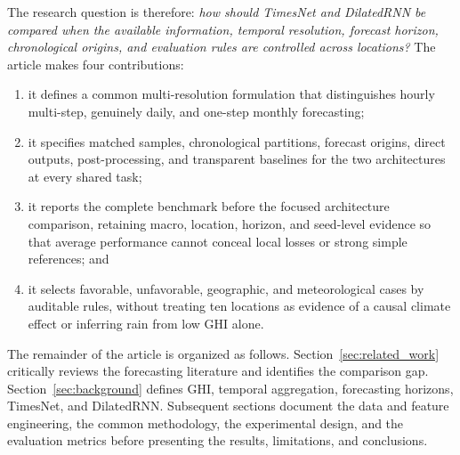 The research question is therefore: \emph{how should TimesNet and DilatedRNN
be compared when the available information, temporal resolution, forecast
horizon, chronological origins, and evaluation rules are controlled across
locations?} The article makes four contributions:
\begin{enumerate}
  \item it defines a common multi-resolution formulation that distinguishes
  hourly multi-step, genuinely daily, and one-step monthly forecasting;
  \item it specifies matched samples, chronological partitions, forecast
  origins, direct outputs, post-processing, and transparent baselines for the
  two architectures at every shared task;
  \item it reports the complete benchmark before the focused architecture
  comparison, retaining macro, location, horizon, and seed-level evidence so
  that average performance cannot conceal local losses or strong simple
  references; and
  \item it selects favorable, unfavorable, geographic, and meteorological
  cases by auditable rules, without treating ten locations as evidence of a
  causal climate effect or inferring rain from low GHI alone.
\end{enumerate}

The remainder of the article is organized as follows.
Section~\ref{sec:related_work} critically reviews the forecasting literature
and identifies the comparison gap. Section~\ref{sec:background} defines GHI,
temporal aggregation, forecasting horizons, TimesNet, and DilatedRNN.
Subsequent sections document the data and feature engineering, the common
methodology, the experimental design, and the evaluation metrics before
presenting the results, limitations, and conclusions.

